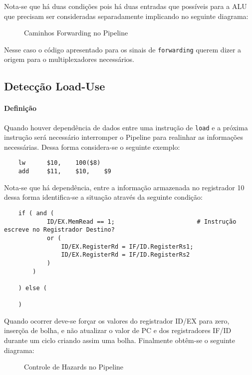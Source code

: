 \documentclass{article}
\begin{document}
\noindent Nota-se que há duas condições pois há duas entradas que possíveis para a ALU que precisam ser consideradas separadamente implicando no seguinte diagrama:
\begin{figure}[H]
    \centering
    \caption{Caminhos Forwarding no Pipeline}
    \label{forwardingPath}
\end{figure}
\noindent Nesse caso o código apresentado para os sinais de \texttt{forwarding} querem dizer a origem para o multiplexadores necessários.\\


\subsection{Detecção Load-Use}
\paragraph{Definição}Quando houver dependência de dados entre uma instrução de \texttt{load} e a próxima instrução será necessário interromper o Pipeline para realinhar as informações necessárias. Dessa forma considera-se o seguinte exemplo:
\begin{scriptsize}
    \myStyleRISCV
    \begin{lstlisting}
    lw      $10,    100($8)
    add     $11,    $10,    $9
    \end{lstlisting}
\end{scriptsize}
\noindent Nota-se que há dependência, entre a informação armazenada no registrador 10 dessa forma identifica-se a situação através da seguinte condição:
\begin{scriptsize}
    \myStyleRISCV
    \begin{lstlisting}
    if ( and (
            ID/EX.MemRead == 1;                       # Instrução escreve no Registrador Destino?
            or (
                ID/EX.RegisterRd = IF/ID.RegisterRs1;
                ID/EX.RegisterRd = IF/ID.RegisterRs2
            )
        )

    ) else (

    )
    \end{lstlisting}
\end{scriptsize}
\noindent Quando ocorrer deve-se forçar os valores do registrador ID/EX para zero, inserçõa de bolha, e não atualizar o valor de PC e dos registradores IF/ID durante um ciclo criando assim uma bolha. Finalmente obtêm-se o seguinte diagrama:
\begin{figure}[H]
    \centering
    \caption{Controle de Hazards no Pipeline}
    \label{controlHazardsPipeline}
\end{figure}
\end{document}
